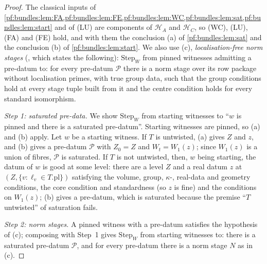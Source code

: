 \begin{proof}
The classical inputs of \cref{pf:bundles:lem:FA,pf:bundles:lem:FE,pf:bundles:lem:WC,pf:bundles:lem:sat,pf:bundles:lem:start} and of (LU) are
components of $\mathcal H_A$ and $\mathcal H_C$, so (WC), (LU), (FA) and (FE) hold, and with them the conclusion (a) of \cref{pf:bundles:lem:sat}
and the conclusion (b) of \cref{pf:bundles:lem:start}. We also use (c), \emph{localisation-free norm stages}
(, which states the following):
$\mathrm{Step}_W$ from pinned witnesses admitting a pre-datum to: for every pre-datum $\mathcal P$ there is a norm stage over its row
package without localisation primes, with true group data, such that the group conditions hold at every stage tuple built from it and
the centre condition holds for every standard isomorphism.

\emph{Step 1: saturated pre-data.} We show $\mathrm{Step}_W$ from starting witnesses to ``$w$ is pinned and there is a saturated
pre-datum''. Starting witnesses are pinned, so (a) and (b) apply. Let $w$ be a starting witness. If $T$ is untwisted, (a) gives $Z$ and $z$,
and (b) gives a pre-datum $\mathcal P$ with $Z_0=Z$ and $W_t=W_1(z)$; since $W_1(z)$ is a union of fibres, $\mathcal P$ is saturated. If
$T$ is not untwisted, then, $w$ being starting, the datum of $w$ is good at some level: there are a level $Z$ and a real datum $z$ at
$(Z,\{v:\ell_v\in T.\mathrm{pl}\})$ satisfying the volume, group, $\kappa$-, real-data and geometry conditions, the core condition and
standardness (so $z$ is fine) and the conditions on $W_1(z)$; (b) gives a pre-datum, which is saturated because the premise ``$T$
untwisted'' of saturation fails.

\emph{Step 2: norm stages.} A pinned witness with a pre-datum satisfies the hypothesis of (c); composing with Step~1 gives
$\mathrm{Step}_W$ from starting witnesses to: there is a saturated pre-datum $\mathcal P$, and for every pre-datum there is a norm stage
$N$ as in (c).


\end{proof}
